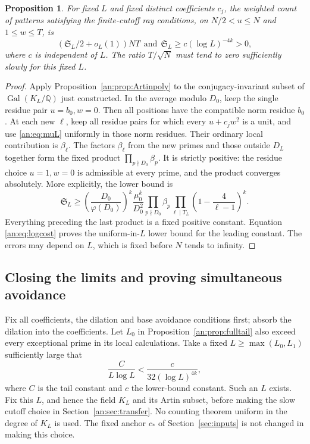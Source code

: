 \documentclass[11pt,reqno]{amsart}
\newtheorem{proposition}[theorem]{Proposition}
\theoremstyle{definition}
\numberwithin{equation}{section}
\newcommand{\Gal}{\operatorname{Gal}}
\newcommand{\Q}{\mathbb Q}
\def\t{\text}
\begin{document}
\begin{proposition}\label{an:prop:lower}
For fixed $L$ and fixed distinct coefficients $c_j$, the weighted count of patterns satisfying the finite-cutoff ray conditions, on $N/2<u\le N$ and  $1\le w\le T$, is
\[
 (\mathfrak S_L/2+o_L(1))NT\ \ \t{and}\ \ \mathfrak S_L\ge c(\log L)^{-4k}>0,
\]
where $c$ is independent of $L$. The ratio $T/\sqrt N$ must tend to zero sufficiently slowly for this fixed $L$.
\end{proposition}
\begin{proof}
Apply Proposition~\ref{an:prop:Artinpoly} to the conjugacy-invariant subset of $\Gal(K_L/\Q)$ just constructed. In the average modulo $D_0$, keep the single residue pair $u=b_0,w=0$. Then all positions have the compatible norm residue $b_0$. At each new $\ell$, keep all residue pairs for which every $u+c_jw^2$ is a unit, and use \eqref{an:eq:muL} uniformly in those norm residues. Their ordinary local contribution is $\beta_\ell$. The factors $\beta_\ell$ from the new primes and those outside $D_L$ together form the fixed product $\prod_{p\nmid D_0}\beta_p$. It is strictly positive: the residue choice $u=1,w=0$ is admissible at every prime, and the product converges absolutely. More explicitly, the lower bound is
\[
 \mathfrak S_L\ge
 \left(\frac{D_0}{\varphi(D_0)}\right)^k
 \frac{\mu_0^k}{D_0^2}
 \prod_{p\nmid D_0}\beta_p
 \prod_{\ell\mid T_L}\left(1-\frac4{\ell-1}\right)^k.
\]
Everything preceding the last product is a fixed positive constant. Equation \eqref{an:eq:logcost} proves the uniform-in-$L$ lower bound for the leading constant. The errors may depend on $L$, which is fixed before $N$ tends to infinity.
\end{proof}



\subsection{Closing the limits and proving simultaneous avoidance}\label{an:sec:closing}
Fix all coefficients, the dilation and base avoidance conditions first; absorb the dilation into the coefficients. Let $L_0$ in Proposition~\ref{an:prop:fulltail} also exceed every exceptional prime in its local calculations. Take a fixed $L\ge\max(L_0,L_1)$ sufficiently large that
\begin{equation}\label{an:eq:compare}
 \frac C{L\log L}<\frac c{32(\log L)^{4k}},
\end{equation}
where $C$ is the tail constant and $c$ the lower-bound constant. Such an $L$ exists. Fix this $L$, and hence the field $K_L$ and its Artin subset, before making the slow cutoff choice in Section~\ref{an:sec:transfer}. No counting theorem uniform in the degree of $K_L$ is used. The fixed anchor $c_\ast$ of Section~\ref{sec:inputs} is not changed in making this choice.
\end{document}
